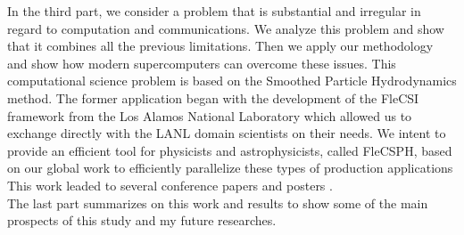 In the third part, we consider a problem that is substantial and irregular in regard to computation and communications.
We analyze this problem and show that it combines all the previous limitations. 
Then we apply our methodology and show how modern supercomputers can overcome these issues. 
This computational science problem is based on the Smoothed Particle Hydrodynamics method.
The former application began with the development of the FleCSI framework from the Los Alamos National Laboratory which allowed us to exchange directly with the LANL domain scientists on their needs.
We intent to provide an efficient tool for physicists and astrophysicists, called FleCSPH, based on our global work to efficiently parallelize these types of production applications
This work leaded to several conference papers \cite{loiseau2018Flecsphg,loiseau2018CARLA} and posters \cite{debrye20162HOT,loiseau2017SC}.\\

The last part summarizes on this work and results to show some of the main prospects of this study and my future researches.
